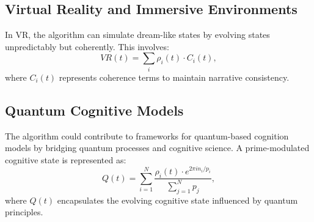 \documentclass{article}
\theoremstyle{plain}
\begin{document}
\subsection{Virtual Reality and Immersive Environments}
In VR, the algorithm can simulate dream-like states by evolving states unpredictably but coherently. This involves:
\begin{equation}
VR(t) = \sum_{i} \rho_i(t) \cdot C_i(t),
\end{equation}
where $C_i(t)$ represents coherence terms to maintain narrative consistency.

\subsection{Quantum Cognitive Models}
The algorithm could contribute to frameworks for quantum-based cognition models by bridging quantum processes and cognitive science. A prime-modulated cognitive state is represented as:
\begin{equation}
Q(t) = \sum_{i=1}^N \frac{\rho_i(t) \cdot e^{2\pi i n_i / p_i}}{\sum_{j=1}^N p_j},
\end{equation}
where $Q(t)$ encapsulates the evolving cognitive state influenced by quantum principles.
\end{document}
